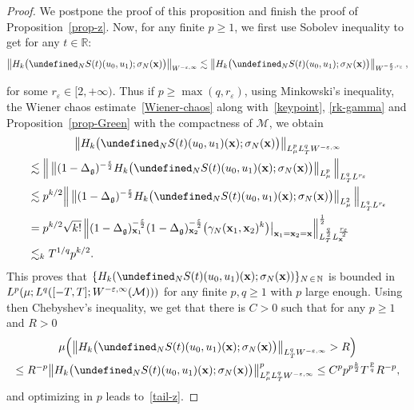 \documentclass[10pt]{amsart}
\theoremstyle{definition}\newtheorem{defi}[theo]{Definition}\newtheorem{rema}[theo]{Remark}\newtheorem{exam}[theo]{Example}\newtheorem{exem}[theo]{Example}\newtheorem{nota}[theo]{Notation}
\newcommand{\R}{\mathbb{R}}
\newcommand{\N}{\mathbb{N}}
\let\P= \undefined
\newcommand{\P}{\mathbf{P}}
\newcommand{\x}{\mathbf{x}}
\newcommand{\M}{\mathcal{M}}
\newcommand{\g}{\mathfrak{g}}
\newcommand{\Dlg}{\Delta_{\g}}
\newcommand{\eps}{\varepsilon}
\newcommand{\s}{\sigma}
\newcommand{\les}{\lesssim}
\begin{document}
\begin{proof}
We postpone the proof of this proposition and finish the proof of Proposition~\ref{prop-z}. Now, for any finite $p\geq 1$, we first use Sobolev inequality to get for any $t\in\R$:
\begin{equation*}
\left\|H_k\big(\P_NS(t)(u_0,u_1);\s_N(\x)\big)\right\|_{W^{-\eps,\infty} }\les \left\|H_k\big(\P_NS(t)(u_0,u_1);\s_N(\x)\big)\right\|_{W^{-\frac{\eps}{2},r_{\eps}} },
\end{equation*}
\pagebreak

\noindent for some $r_{\eps}\in [2,+\infty)$. Thus if $p\geq \max(q, r_{\eps})$, using Minkowski's inequality, the Wiener chaos estimate~\eqref{Wiener-chaos} along with~\eqref{keypoint}, \eqref{rk-gamma} and Proposition~\ref{prop-Green} with the compactness of $\M$, we obtain
\begin{multline*}
\big\|H_k\big(\P_NS(t)(u_0,u_1)(\x);\s_N(\x)\big)\big\|_{ L^p_{\mu}L^{q}_TW^{-\eps,\infty} }\\
\begin{aligned}
&\les \Big\|\left\|(1-\Dlg)^{-\frac\eps2}H_k\big(\P_NS(t)(u_0,u_1)(\x);\s_N(\x)\big)\right\|_{L^p_\mu}\Big\|_{L^q_TL^{r_{\eps}} }\\
& \les p^{k/2} \Big\|\left\|(1-\Dlg)^{-\frac\eps2}H_k\big(\P_NS(t)(u_0,u_1)(\x);\s_N(\x)\big)\right\|_{L^2_\mu}\Big\|_{L^q_TL^{r_{\eps}}}\\
&= p^{k/2} \sqrt{k!}\left\|(1-\Dlg)_{\x_1}^{-\frac\eps2}(1-\Dlg)_{\x_2}^{-\frac{\eps}2}\big(\gamma_N(\x_1,\x_2)^k\big)\big|_{\x_1=\x_2=\x}\right\|_{L^{\frac{q}2}_TL^{\frac{r_{\eps}}2}_\x}^\frac12\\
&\les_k T^{1/q}p^{k/2}.
\end{aligned}
\end{multline*}
This proves that $\{H_k(\P_NS(t)(u_0,u_1)(\x);\s_N(\x))\}_{N\,\in\,\N}$ is bounded in $L^p(\mu;L^q([-T,T];\linebreak W^{-\eps,\infty}(\M)))$ for any finite $p,q\geq 1$ with $p$ large enough. Using then Chebyshev's inequality, we get that there is $C>0$ such that for any $p\geq 1$ and $R>0$
\begin{multline*}
\mu\Big(\big\|H_k\big(\P_NS(t)(u_0,u_1)(\x);\s_N(\x)\big)\big\|_{L^q_TW^{-\eps,\infty}}>R\Big) \\
\leq R^{-p}\big\|H_k\big(\P_NS(t)(u_0,u_1)(\x);\s_N(\x)\big)\big\|_{L^p_{\mu} L^q_TW^{-\eps,\infty} }^p\le C^p p^{p\frac{k}2}T^{\frac{p}q}R^{-p},
\end{multline*}
and optimizing in $p$ leads to~\eqref{tail-z}.


\end{proof}
\end{document}
